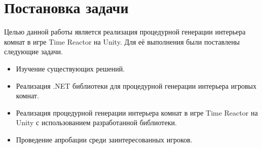 
\section{Постановка задачи}

Целью данной работы является реализация процедурной генерации интерьера комнат в игре Time Reactor на Unity. Для её выполнения были поставлены следующие задачи.

\begin{itemize}
    \item Изучение существующих решений.
    \item Реализация .NET библиотеки для процедурной генерации интерьера игровых комнат.
    \item Реализация процедурной генерации интерьера комнат в игре Time
    Reactor на Unity с использованием разработанной библиотеки.
    \item Проведение апробации среди заинтересованных игроков.
\end{itemize}